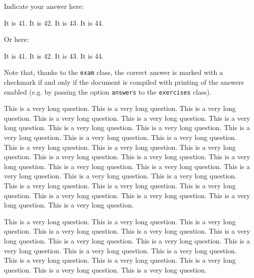 Indicate your answer here:

\begin{checkboxes}
	\choice It is 41.
	\choice It is 42.
	\CorrectChoice It is 43.
	\choice It is 44.
\end{checkboxes}

Or here:

\begin{oneparcheckboxes}
	\choice It is 41.
	\choice It is 42.
	\CorrectChoice It is 43.
	\choice It is 44.
\end{oneparcheckboxes}

\begin{solution}
	Note that, thanks to the \texttt{exam} class, the correct answer is marked with a checkmark if and only if the document is compiled with printing of the answers enabled (e.g. by passing the option \texttt{answers} to the \texttt{exercises} class).
\end{solution}

\question
This is a very long question. This is a very long question. This is a very long question. This is a very long question. This is a very long question. This is a very long question. This is a very long question. This is a very long question. This is a very long question. This is a very long question. This is a very long question. This is a very long question. This is a very long question. This is a very long question. This is a very long question. This is a very long question. This is a very long question. This is a very long question. This is a very long question. This is a very long question. This is a very long question. This is a very long question. This is a very long question. This is a very long question. This is a very long question. This is a very long question. This is a very long question. This is a very long question. This is a very long question.

This is a very long question. This is a very long question. This is a very long question. This is a very long question. This is a very long question. This is a very long question. This is a very long question. This is a very long question. This is a very long question. This is a very long question. This is a very long question. This is a very long question. This is a very long question. This is a very long question. This is a very long question. This is a very long question. 

